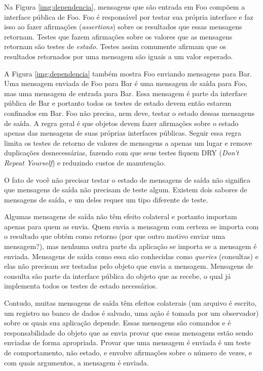 Na Figura \ref{img:dependencia}, mensagens que são entrada em Foo compõem a interface pública de Foo. Foo é responsável por testar sua própria interface e faz isso ao fazer afirmações (\textit{assertions}) sobre os resultados que essas mensagens retornam. Testes que fazem afirmações sobre os valores que as mensagens retornam são testes de \textit{estado}. Testes assim comumente afirmam que os resultados retornados por uma mensagem são iguais a um valor esperado.

A Figura \ref{img:dependencia} também mostra Foo enviando mensagens para Bar. Uma mensagem enviada de Foo para Bar é uma mensagem de saída para Foo, mas uma mensagem de entrada para Bar. Essa mensagem é parte da interface pública de Bar e portanto todos os testes de estado devem então estarem confinados em Bar. Foo não precisa, nem deve, testar o estado dessas mensagens de saída. A regra geral é que objetos devem fazer afirmações sobre o estado apenas das mensagens de suas próprias interfaces públicas. Seguir essa regra limita os testes de retorno de valores de mensagens a apenas um lugar e remove duplicações desnecessárias, fazendo com que seus testes fiquem DRY (\textit{Don't Repeat Yourself}) e reduzindo custos de manutenção.

O fato de você não precisar testar o estado de mensagens de saída não significa que mensagens de saída não precisam de teste algum. Existem dois sabores de mensagens de saída, e um deles requer um tipo diferente de teste.

Algumas mensagens de saída não têm efeito colateral e portanto importam apenas para quem as envia. Quem envia a mensagem com certeza se importa com o resultado que obtém como retorno (por que outro motivo enviar uma mensagem?), mas nenhuma outra parte da aplicação se importa se a mensagem é enviada. Mensagens de saída como essa são conhecidas como \textit{queries} (consultas) e elas não precisam ser testadas pelo objeto que envia a mensagem. Mensagens de consulta são parte da interface pública do objeto que as recebe, o qual já implementa todos os testes de estado necessários.

Contudo, muitas mensagens de saída têm efeitos colaterais (um arquivo é escrito, um registro no banco de dados é salvado, uma ação é tomada por um observador) sobre os quais sua aplicação depende. Essas mensagens são comandos e é responsabilidade do objeto que as envia provar que essas mensagens estão sendo enviadas de forma apropriada. Provar que uma mensagem é enviada é um teste de comportamento, não estado, e envolve afirmações sobre o número de vezes, e com quais argumentos, a mensagem é enviada.

